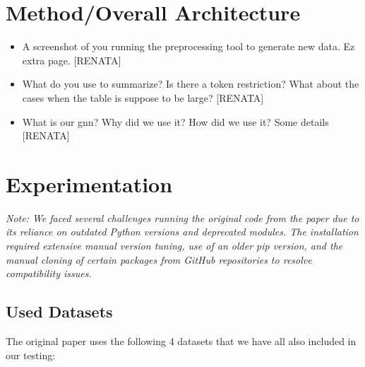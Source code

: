 \documentclass[12pt,a4paper]{article}
\begin{document}
\section*{Method/Overall Architecture}

\begin{itemize}
\item A screenshot of you running the preprocessing tool to generate new data. Ez extra page. [RENATA]
\item What do you use to summarize? Is there a token restriction? What about the cases when the table is suppose to be large? [RENATA]
\item What is our gnn? Why did we use it? How did we use it? Some details [RENATA]
\end{itemize}

\section*{Experimentation}
\textit{Note: We faced several challenges running the original code from the paper due to its reliance on outdated Python versions and deprecated modules. The installation required extensive manual version tuning, use of an older pip version, and the manual cloning of certain packages from GitHub repositories to resolve compatibility issues. }
\ \\
\subsection*{Used Datasets}
The original paper uses the following 4 datasets that we have all also included in our testing:
\end{document}
